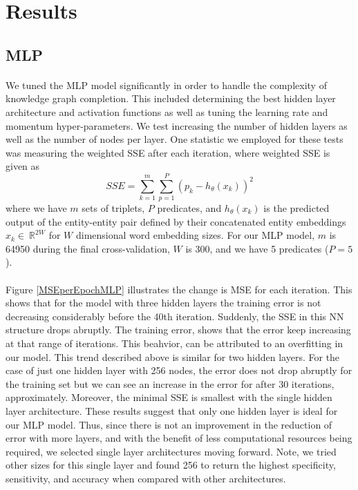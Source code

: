 \documentclass[11.5pt]{article}
\newcounter{Figure}
\newcommand{\R}{\ \mathbb{R}}
\begin{document}
\section{Results}
\subsection{MLP}

\paragraph{} We tuned the MLP model significantly in order to handle the complexity of knowledge graph completion. This included determining the best hidden layer architecture and activation functions as well as tuning the learning rate and momentum hyper-parameters.  We test increasing the number of hidden layers as well as the number of nodes per layer.  One statistic we employed for these tests was measuring the weighted SSE after each iteration, where weighted SSE is given as 
$$ SSE = \sum_{k=1}^m \sum_{p=1}^P (p_k - h_\theta(x_k))^2 $$
where we have $m$ sets of triplets, $P$ predicates, and $h_\theta(x_k)$ is the predicted output of the entity-entity pair defined by their concatenated entity embeddings $x_k\in \R^{2 W}$ for $W$ dimensional word embedding sizes. For our MLP model, $m$ is 64950 during the final cross-validation, $W$ is 300, and we have 5 predicates ($P=5$). 

 
\paragraph{} Figure \ref{MSEperEpochMLP} illustrates the change is MSE for each iteration. This shows that for the model with three hidden layers the training error is not decreasing considerably before the 40th iteration. Suddenly, the SSE in this NN structure drops abruptly. The training error, shows that the error keep increasing at that range of iterations. This beahvior, can be attributed to an overfitting in our model.  This trend described above is similar for two hidden layers. For the case of just one hidden layer with 256 nodes, the error does not drop abruptly for the training set but we can see an increase in the error for after 30 iterations, approximately. Moreover, the minimal SSE is smallest with the single hidden layer architecture. These results suggest that only one hidden layer is ideal for our MLP model. Thus, since there is not an improvement in the reduction of error with more layers, and with the benefit of less computational resources being required, we selected single layer architectures moving forward. Note, we tried other sizes for this single layer and found 256 to return the highest specificity, sensitivity, and accuracy when compared with other architectures. 
\end{document}
